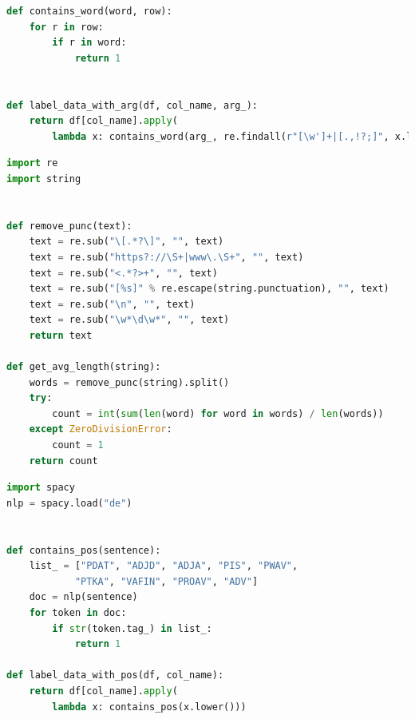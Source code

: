 \begin{lstlisting}[language=Python,caption=Die Funktion labelt nach bestimmten Kriterien den Datensatz, label={Label1}]
def contains_word(word, row):
    for r in row:
        if r in word:
            return 1


def label_data_with_arg(df, col_name, arg_):
    return df[col_name].apply(
        lambda x: contains_word(arg_, re.findall(r"[\w']+|[.,!?;]", x.lower())))
\end{lstlisting}

\begin{lstlisting}[language=Python,caption=Funktionen die die durchschnittliche Wortlänge erkennen und nach Interpunktion filtern, label={Label2}]
import re
import string


def remove_punc(text):
    text = re.sub("\[.*?\]", "", text)
    text = re.sub("https?://\S+|www\.\S+", "", text)
    text = re.sub("<.*?>+", "", text)
    text = re.sub("[%s]" % re.escape(string.punctuation), "", text)
    text = re.sub("\n", "", text)
    text = re.sub("\w*\d\w*", "", text)
    return text

def get_avg_length(string):
    words = remove_punc(string).split()
    try:
        count = int(sum(len(word) for word in words) / len(words))
    except ZeroDivisionError:
        count = 1
    return count
\end{lstlisting}

\begin{lstlisting}[language=Python,caption=Tagger Funktion, welches den Text nach der Grammatik filtert, label={Label3}]
import spacy
nlp = spacy.load("de")


def contains_pos(sentence):
    list_ = ["PDAT", "ADJD", "ADJA", "PIS", "PWAV", 
            "PTKA", "VAFIN", "PROAV", "ADV"]
    doc = nlp(sentence)
    for token in doc:
        if str(token.tag_) in list_:
            return 1

def label_data_with_pos(df, col_name):
    return df[col_name].apply(
        lambda x: contains_pos(x.lower()))
\end{lstlisting}


